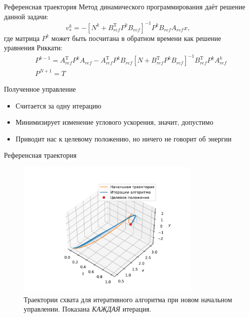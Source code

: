 \documentclass[16pt]{beamer}
\begin{document}
    \begin{frame}{Референсная траектория}
        Метод динамического программирования даёт решение данной задачи:
        $$
            v^k_* = -[N^k + B_{ref}^{\mathrm{T}}P^kB_{ref}]^{-1}P^kB_{ref}A_{ref} x,
        $$
        где матрица $P^k$ может быть посчитана в обратном времени как решение уравнения Риккати:
        $$
            \begin{aligned}
                &P^{k-1} = A_{ref}^{\mathrm{T}} P^{k} A_{ref} - A_{ref}^{\mathrm{T}}P^kB_{ref}[N + B_{ref}^\mathrm{T}P^kB_{ref}]^{-1}B_{ref}^{\mathrm{T}}P^{k}A_{ref}^{k}
                \\
                &P^{N+1} = T
            \end{aligned}
        $$
        \begin{block}{Полученное управление}
            \begin{itemize}
                \item Считается за одну итерацию
                \item Минимизирует изменение углового ускорения, значит, допустимо
                \item Приводит нас к целевому положению, но ничего не говорит об энергии
            \end{itemize}
        \end{block}
    \end{frame}

    \begin{frame}{Референсная траектория}
        \begin{figure}
            \includegraphics[width=0.8\textwidth]{ddp_dummy.pdf}
            \caption{Траектории схвата для итеративного алгоритма при новом начальном управлении. Показана \textit{КАЖДАЯ} итерация.}
        \end{figure}
    \end{frame}
\end{document}
